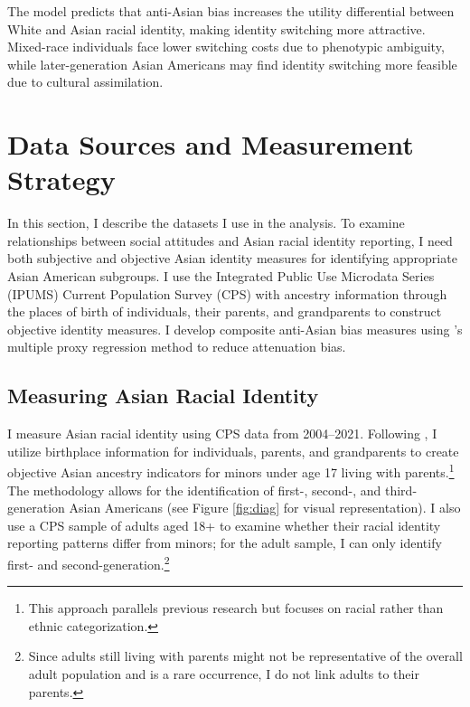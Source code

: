 \documentclass[12pt,english]{article}
\begin{document}
The model predicts that anti-Asian bias increases the utility differential between White and Asian racial identity, making identity switching more attractive. Mixed-race individuals face lower switching costs due to phenotypic ambiguity, while later-generation Asian Americans may find identity switching more feasible due to cultural assimilation.

\section{Data Sources and Measurement Strategy}\label{sec:data}

In this section, I describe the datasets I use in the analysis. To examine relationships between social attitudes and Asian racial identity reporting, I need both subjective and objective Asian identity measures for identifying appropriate Asian American subgroups. I use the Integrated Public Use Microdata Series (IPUMS) Current Population Survey (CPS) \autocite{floodsarahIntegratedPublicUse2021a} with ancestry information through the places of birth of individuals, their parents, and grandparents to construct objective identity measures. I develop composite anti-Asian bias measures using \textcite{lubotskyInterpretationRegressionsMultiple2006}'s multiple proxy regression method to reduce attenuation bias.

\subsection{Measuring Asian Racial Identity}\label{subsec:cps}

I measure Asian racial identity using CPS data from 2004--2021. Following \textcite{antmanEthnicAttritionObserved2016,antmanEthnicAttritionAssimilation2020}, I utilize birthplace information for individuals, parents, and grandparents to create objective Asian ancestry indicators for minors under age 17 living with parents.\footnote{This approach parallels previous research but focuses on racial rather than ethnic categorization.} The methodology allows for the identification of first-, second-, and third-generation Asian Americans (see Figure \ref{fig:diag} for visual representation). I also use a CPS sample of adults aged 18+ to examine whether their racial identity reporting patterns differ from minors; for the adult sample, I can only identify first- and second-generation.\footnote{Since adults still living with parents might not be representative of the overall adult population and is a rare occurrence, I do not link adults to their parents.}
\end{document}
